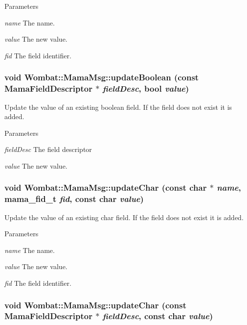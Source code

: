 \begin{DoxyParams}{Parameters}
\item[{\em name}]The name. \item[{\em value}]The new value. \item[{\em fid}]The field identifier. \end{DoxyParams}
\hypertarget{classWombat_1_1MamaMsg_a8f8ba0ad3f4ff75e2f72914251a45f18}{
\subsubsection[{updateBoolean}]{\setlength{\rightskip}{0pt plus 5cm}void Wombat::MamaMsg::updateBoolean (const {\bf MamaFieldDescriptor} $\ast$ {\em fieldDesc}, \/  bool {\em value})}}
\label{classWombat_1_1MamaMsg_a8f8ba0ad3f4ff75e2f72914251a45f18}


Update the value of an existing boolean field. If the field does not exist it is added.


\begin{DoxyParams}{Parameters}
\item[{\em fieldDesc}]The field descriptor \item[{\em value}]The new value. \end{DoxyParams}
\hypertarget{classWombat_1_1MamaMsg_a492e63d5fdaf884275d1180739fe6162}{
\subsubsection[{updateChar}]{\setlength{\rightskip}{0pt plus 5cm}void Wombat::MamaMsg::updateChar (const char $\ast$ {\em name}, \/  mama\_\-fid\_\-t {\em fid}, \/  const char {\em value})}}
\label{classWombat_1_1MamaMsg_a492e63d5fdaf884275d1180739fe6162}


Update the value of an existing char field. If the field does not exist it is added.


\begin{DoxyParams}{Parameters}
\item[{\em name}]The name. \item[{\em value}]The new value. \item[{\em fid}]The field identifier. \end{DoxyParams}
\hypertarget{classWombat_1_1MamaMsg_aa942ec291fe79302f98b172ab610e96b}{
\subsubsection[{updateChar}]{\setlength{\rightskip}{0pt plus 5cm}void Wombat::MamaMsg::updateChar (const {\bf MamaFieldDescriptor} $\ast$ {\em fieldDesc}, \/  const char {\em value})}}
\label{classWombat_1_1MamaMsg_aa942ec291fe79302f98b172ab610e96b}


